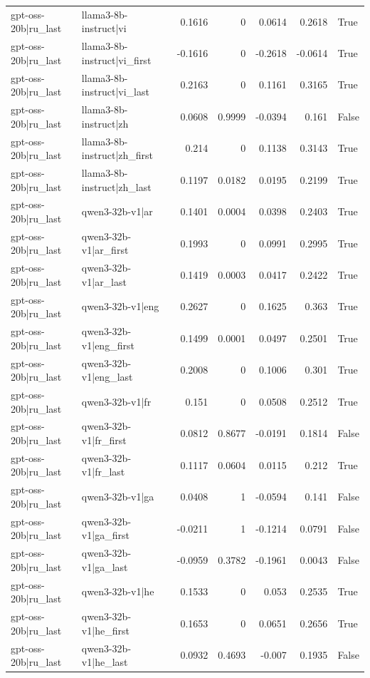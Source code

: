 \begin{table}
\begin{tabular}{l l r r r r l}
gpt-oss-20b|ru_last & llama3-8b-instruct|vi & 0.1616 & 0 & 0.0614 & 0.2618 & True \\
gpt-oss-20b|ru_last & llama3-8b-instruct|vi_first & -0.1616 & 0 & -0.2618 & -0.0614 & True \\
gpt-oss-20b|ru_last & llama3-8b-instruct|vi_last & 0.2163 & 0 & 0.1161 & 0.3165 & True \\
gpt-oss-20b|ru_last & llama3-8b-instruct|zh & 0.0608 & 0.9999 & -0.0394 & 0.161 & False \\
gpt-oss-20b|ru_last & llama3-8b-instruct|zh_first & 0.214 & 0 & 0.1138 & 0.3143 & True \\
gpt-oss-20b|ru_last & llama3-8b-instruct|zh_last & 0.1197 & 0.0182 & 0.0195 & 0.2199 & True \\
gpt-oss-20b|ru_last & qwen3-32b-v1|ar & 0.1401 & 0.0004 & 0.0398 & 0.2403 & True \\
gpt-oss-20b|ru_last & qwen3-32b-v1|ar_first & 0.1993 & 0 & 0.0991 & 0.2995 & True \\
gpt-oss-20b|ru_last & qwen3-32b-v1|ar_last & 0.1419 & 0.0003 & 0.0417 & 0.2422 & True \\
gpt-oss-20b|ru_last & qwen3-32b-v1|eng & 0.2627 & 0 & 0.1625 & 0.363 & True \\
gpt-oss-20b|ru_last & qwen3-32b-v1|eng_first & 0.1499 & 0.0001 & 0.0497 & 0.2501 & True \\
gpt-oss-20b|ru_last & qwen3-32b-v1|eng_last & 0.2008 & 0 & 0.1006 & 0.301 & True \\
gpt-oss-20b|ru_last & qwen3-32b-v1|fr & 0.151 & 0 & 0.0508 & 0.2512 & True \\
gpt-oss-20b|ru_last & qwen3-32b-v1|fr_first & 0.0812 & 0.8677 & -0.0191 & 0.1814 & False \\
gpt-oss-20b|ru_last & qwen3-32b-v1|fr_last & 0.1117 & 0.0604 & 0.0115 & 0.212 & True \\
gpt-oss-20b|ru_last & qwen3-32b-v1|ga & 0.0408 & 1 & -0.0594 & 0.141 & False \\
gpt-oss-20b|ru_last & qwen3-32b-v1|ga_first & -0.0211 & 1 & -0.1214 & 0.0791 & False \\
gpt-oss-20b|ru_last & qwen3-32b-v1|ga_last & -0.0959 & 0.3782 & -0.1961 & 0.0043 & False \\
gpt-oss-20b|ru_last & qwen3-32b-v1|he & 0.1533 & 0 & 0.053 & 0.2535 & True \\
gpt-oss-20b|ru_last & qwen3-32b-v1|he_first & 0.1653 & 0 & 0.0651 & 0.2656 & True \\
gpt-oss-20b|ru_last & qwen3-32b-v1|he_last & 0.0932 & 0.4693 & -0.007 & 0.1935 & False \\

\end{tabular}
\end{table}
